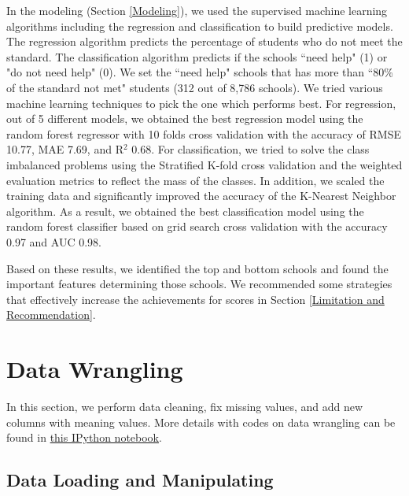 \documentclass[11pt]{article}
\begin{document}
In the modeling (Section \ref{Modeling}), we used the supervised machine learning  algorithms including the regression and classification to build predictive models. 
%
The regression algorithm predicts the percentage of students who do not meet the standard. The classification algorithm predicts if the schools ``need help" (1) or "do not need help" (0). 
%
We set the ``need help" schools that has more than ``80\% of the standard not met" students (312 out of 8,786 schools).
%
We tried various machine learning techniques to pick the one which performs best.
%
For regression, out of 5 different models, we obtained the best regression model using the random forest regressor with 10 folds cross validation
with the accuracy of RMSE 10.77, MAE 7.69, and R$^{2}$ 0.68.
%
For classification, we tried to solve the class imbalanced problems using the Stratified K-fold cross validation and the weighted evaluation metrics to reflect the mass of the classes. In addition, we scaled the training data and significantly improved the accuracy of the K-Nearest Neighbor algorithm.
%
As a result, we obtained the best classification model using the random forest classifier based on grid search cross validation with the accuracy 0.97 and AUC 0.98.

Based on these results, we identified the top and bottom schools and found the important features determining those schools.
%
We recommended some strategies
that effectively increase the achievements for scores in Section \ref{Limitation and Recommendation}. 


\section{Data Wrangling} \label{Data Wrangling}

In this section, we perform data cleaning, fix missing values, and add
new columns with meaning values. 
More details with codes on data wrangling can be found in
\href{https://github.com/ahrimhan/data-science-project/blob/master/project1/data_wrangling.ipynb}{this IPython notebook}. 


\subsection{Data Loading and Manipulating}
\end{document}
